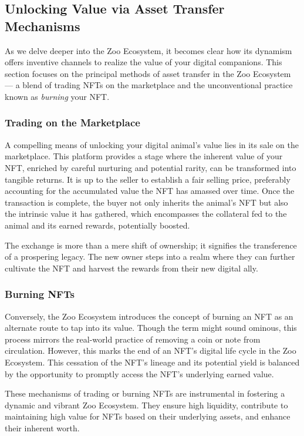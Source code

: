 \subsection{Unlocking Value via Asset Transfer Mechanisms}

As we delve deeper into the Zoo Ecosystem, it becomes clear how its dynamism offers inventive channels to realize the value of your digital companions. This section focuses on the principal methods of asset transfer in the Zoo Ecosystem --- a blend of trading NFTs on the marketplace and the unconventional practice known as \emph{burning} your NFT.

\subsubsection{Trading on the Marketplace}

A compelling means of unlocking your digital animal's value lies in its sale on the marketplace. This platform provides a stage where the inherent value of your NFT, enriched by careful nurturing and potential rarity, can be transformed into tangible returns. It is up to the seller to establish a fair selling price, preferably accounting for the accumulated value the NFT has amassed over time. Once the transaction is complete, the buyer not only inherits the animal's NFT but also the intrinsic value it has gathered, which encompasses the collateral fed to the animal and its earned rewards, potentially boosted.

The exchange is more than a mere shift of ownership; it signifies the transference of a prospering legacy. The new owner steps into a realm where they can further cultivate the NFT and harvest the rewards from their new digital ally.

\subsubsection{Burning NFTs}

Conversely, the Zoo Ecosystem introduces the concept of burning an NFT as an alternate route to tap into its value. Though the term might sound ominous, this process mirrors the real-world practice of removing a coin or note from circulation. However, this marks the end of an NFT's digital life cycle in the Zoo Ecosystem. This cessation of the NFT's lineage and its potential yield is balanced by the opportunity to promptly access the NFT's underlying earned value.

These mechanisms of trading or burning NFTs are instrumental in fostering a dynamic and vibrant Zoo Ecosystem. They ensure high liquidity, contribute to maintaining high value for NFTs based on their underlying assets, and enhance their inherent worth.

